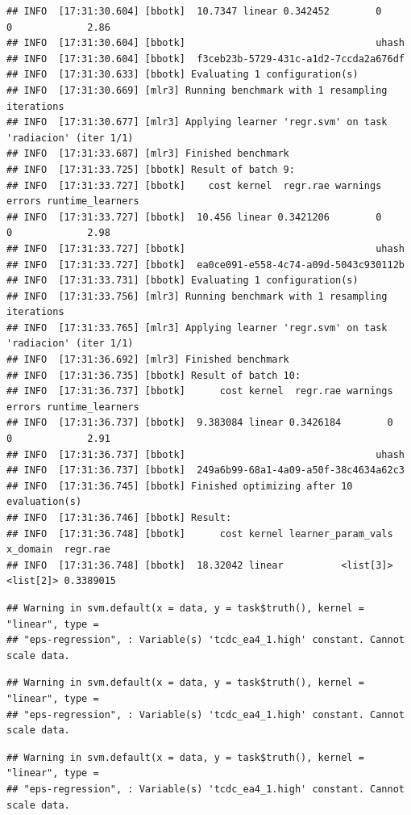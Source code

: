 \documentclass[
  11pt,
  a4paper,
]{article}
\begin{document}
\begin{verbatim}
## INFO  [17:31:30.604] [bbotk]  10.7347 linear 0.342452        0      0             2.86
## INFO  [17:31:30.604] [bbotk]                                 uhash
## INFO  [17:31:30.604] [bbotk]  f3ceb23b-5729-431c-a1d2-7ccda2a676df
## INFO  [17:31:30.633] [bbotk] Evaluating 1 configuration(s)
## INFO  [17:31:30.669] [mlr3] Running benchmark with 1 resampling iterations
## INFO  [17:31:30.677] [mlr3] Applying learner 'regr.svm' on task 'radiacion' (iter 1/1)
## INFO  [17:31:33.687] [mlr3] Finished benchmark
## INFO  [17:31:33.725] [bbotk] Result of batch 9:
## INFO  [17:31:33.727] [bbotk]    cost kernel  regr.rae warnings errors runtime_learners
## INFO  [17:31:33.727] [bbotk]  10.456 linear 0.3421206        0      0             2.98
## INFO  [17:31:33.727] [bbotk]                                 uhash
## INFO  [17:31:33.727] [bbotk]  ea0ce091-e558-4c74-a09d-5043c930112b
## INFO  [17:31:33.731] [bbotk] Evaluating 1 configuration(s)
## INFO  [17:31:33.756] [mlr3] Running benchmark with 1 resampling iterations
## INFO  [17:31:33.765] [mlr3] Applying learner 'regr.svm' on task 'radiacion' (iter 1/1)
## INFO  [17:31:36.692] [mlr3] Finished benchmark
## INFO  [17:31:36.735] [bbotk] Result of batch 10:
## INFO  [17:31:36.737] [bbotk]      cost kernel  regr.rae warnings errors runtime_learners
## INFO  [17:31:36.737] [bbotk]  9.383084 linear 0.3426184        0      0             2.91
## INFO  [17:31:36.737] [bbotk]                                 uhash
## INFO  [17:31:36.737] [bbotk]  249a6b99-68a1-4a09-a50f-38c4634a62c3
## INFO  [17:31:36.745] [bbotk] Finished optimizing after 10 evaluation(s)
## INFO  [17:31:36.746] [bbotk] Result:
## INFO  [17:31:36.748] [bbotk]      cost kernel learner_param_vals  x_domain  regr.rae
## INFO  [17:31:36.748] [bbotk]  18.32042 linear          <list[3]> <list[2]> 0.3389015
\end{verbatim}

\begin{verbatim}
## Warning in svm.default(x = data, y = task$truth(), kernel = "linear", type =
## "eps-regression", : Variable(s) 'tcdc_ea4_1.high' constant. Cannot scale data.
\end{verbatim}

\begin{verbatim}
## Warning in svm.default(x = data, y = task$truth(), kernel = "linear", type =
## "eps-regression", : Variable(s) 'tcdc_ea4_1.high' constant. Cannot scale data.
\end{verbatim}

\begin{verbatim}
## Warning in svm.default(x = data, y = task$truth(), kernel = "linear", type =
## "eps-regression", : Variable(s) 'tcdc_ea4_1.high' constant. Cannot scale data.
\end{verbatim}
\end{document}
